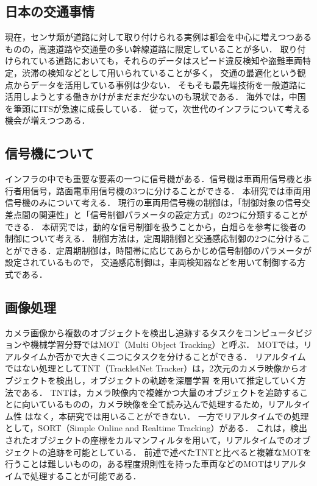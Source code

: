 \subsection{日本の交通事情}
現在，センサ類が道路に対して取り付けられる実例は都会を中心に増えつつあるものの，高速道路や交通量の多い幹線道路に限定していることが多い．
取り付けられている道路においても，それらのデータはスピード違反検知や盗難車両特定，渋滞の検知などとして用いられていることが多く，
交通の最適化という観点からデータを活用している事例は少ない．
そもそも最先端技術を一般道路に活用しようとする働きかけがまだまだ少ないのも現状である．
海外では，中国を筆頭にITSが急速に成長している．%
従って，次世代のインフラについて考える機会が増えつつある．

\subsection{信号機について}
インフラの中でも重要な要素の一つに信号機がある．信号機は車両用信号機と歩行者用信号，路面電車用信号機の3つに分けることができる．
本研究では車両用信号機のみについて考える．
現行の車両用信号機の制御は，「制御対象の信号交差点間の関連性」と「信号制御パラメータの設定方式」の2つに分類することができる．
本研究では，動的な信号制御を扱うことから，白畑ら\cite{shirahata}を参考に後者の制御について考える．
制御方法は，定周期制御と交通感応制御の2つに分けることができる．定周期制御は，時間帯に応じてあらかじめ信号制御のパラメータが設定されているもので，
交通感応制御は，車両検知器などを用いて制御する方式である．

\subsection{画像処理}

カメラ画像から複数のオブジェクトを検出し追跡するタスクをコンピュータビジョンや機械学習分野ではMOT（Multi Object Tracking）と呼ぶ．
MOTでは，リアルタイムか否かで大きく二つにタスクを分けることができる．
リアルタイムではない処理としてTNT（TrackletNet Tracker）は，2次元のカメラ映像からオブジェクトを検出し，オブジェクトの軌跡を深層学習
を用いて推定していく方法である．\cite{wang2019exploit} \cite{tang2018single} TNTは，カメラ映像内で複雑かつ大量のオブジェクトを追跡することに向いているものの，カメラ映像を全て読み込んで処理するため，リアルタイム性
はなく，本研究では用いることができない．
一方でリアルタイムでの処理として，SORT（Simple Online and Realtime Tracking）がある．\cite{bewley2016simple} \cite{wojke2017simple}
これは，検出されたオブジェクトの座標をカルマンフィルタ\cite{kalman1960new}を用いて，リアルタイムでのオブジェクトの追跡を可能としている．
前述で述べたTNTと比べると複雑なMOTを行うことは難しいものの，ある程度規則性を持った車両などのMOTはリアルタイムで処理することが可能である．


\newpage

